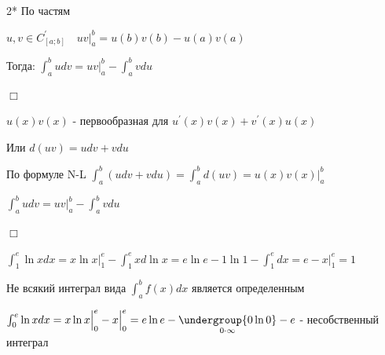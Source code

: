 \documentclass[12pt]{article}
\begin{document}
    2* \hypertarget{integralbyparts}{По частям}

    \Th $u, v \in C^\prime_{[a;b]} \quad uv \Big|_a^b = u(b)v(b) - u(a)v(a)$

    Тогда: $\int^b_a udv = uv \Big|_a^b - \int^b_a vdu$

    $\Box$

    $u(x)v(x)$ - первообразная для $u^\prime(x)v(x) + v^\prime(x)u(x)$

    Или $d(uv) = udv + vdu$

    По формуле N-L $\int_a^b (udv + vdu) = \int^b_a d(uv) = u(x)v(x) \Big|^b_a$

    $\int_a^b udv = uv \Big|^b_a - \int^b_a vdu$

    $\Box$

    \Ex $\int_1^e \ln x dx = x \ln x \Big|^e_1 - \int^e_1 xd\ln x = e \ln e - 1 \ln 1 -
    \int^e_1 dx = e - x \Big|_1^e = 1$

    \Nota Не всякий интеграл вида $\int^b_a f(x) dx $ является определенным

    \Ex $\int^e_0 \ln x dx = x \ln x \Big|_0^e - x \Big|_0^e = e \ln e - \underset{0 \cdot \infty}{\undergroup{0 \ln 0}} - e$ - несобственный интеграл
\end{document}
